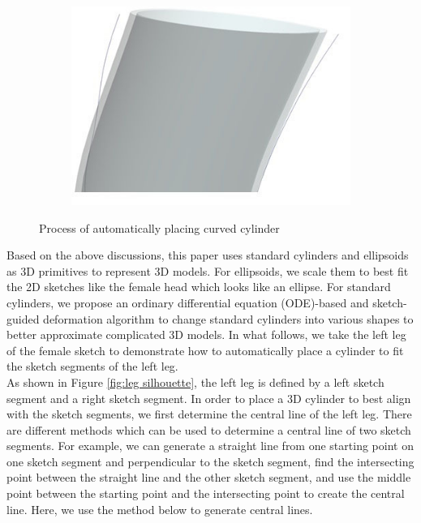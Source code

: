 \documentclass[runningheads]{llncs}
\begin{document}
\begin{figure}[htbp]
    \begin{subfigure}{1.\columnwidth}
    \centering
    \includegraphics[height=2. in]{Fig3e.jpg}
    \caption{}
    \label{fig:cyliders comparison}
    \end{subfigure}
    \caption{Process of automatically placing curved cylinder}
    \label{fig:place curved cylinder}
\end{figure}

Based on the above discussions, this paper uses standard cylinders and ellipsoids as 3D primitives to represent 3D models. For ellipsoids, we scale them to best fit the 2D sketches like the female head which looks like an ellipse. For standard cylinders, we propose an ordinary differential equation (ODE)-based and sketch-guided deformation algorithm to change standard cylinders into various shapes to better approximate complicated 3D models. In what follows, we take the left leg of the female sketch to demonstrate how to automatically place a cylinder to fit the sketch segments of the left leg.\\

As shown in Figure \ref{fig:leg silhouette}, the left leg is defined by a left sketch segment and a right sketch segment. In order to place a 3D cylinder to best align with the sketch segments, we first determine the central line of the left leg. There are different methods which can be used to determine a central line of two sketch segments.  For example, we can generate a straight line from one starting point on one sketch segment and perpendicular to the sketch segment, find the intersecting point between the straight line and the other sketch segment, and use the middle point between the starting point and the intersecting point to create the central line. Here, we use the method below to generate central lines.\\
\end{document}

